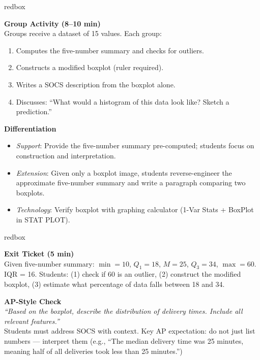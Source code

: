 \documentclass[10pt]{article}
\begin{document}
\boxguard
\begin{skillbox}{redbox}
\begin{minipage}[t]{0.48\linewidth}
    \textbf{Group Activity (8--10 min)}\\
    Groups receive a dataset of 15 values. Each group:
    \begin{enumerate}
        \item Computes the five-number summary and checks for outliers.
        \item Constructs a modified boxplot (ruler required).
        \item Writes a SOCS description from the boxplot alone.
        \item Discusses: ``What would a histogram of this data look like? Sketch a prediction.''
    \end{enumerate}
\end{minipage}
\hfill
\begin{minipage}[t]{0.48\linewidth}
    \textbf{Differentiation}
    \begin{itemize}
        \item \textit{Support}: Provide the five-number summary pre-computed; students focus on construction and interpretation.
        \item \textit{Extension}: Given only a boxplot image, students reverse-engineer the approximate five-number summary and write a paragraph comparing two boxplots.
        \item \textit{Technology}: Verify boxplot with graphing calculator (1-Var Stats + BoxPlot in STAT PLOT).
    \end{itemize}
\end{minipage}
\end{skillbox}

\boxguard
\begin{skillbox}{redbox}
\begin{minipage}[t]{0.48\linewidth}
    \textbf{Exit Ticket (5 min)}\\
    Given five-number summary: $\min=10$, $Q_1=18$, $M=25$, $Q_3=34$, $\max=60$. IQR = 16. Students: (1) check if 60 is an outlier, (2) construct the modified boxplot, (3) estimate what percentage of data falls between 18 and 34.
\end{minipage}
\hfill
\begin{minipage}[t]{0.48\linewidth}
    \textbf{AP-Style Check}\\
    \textit{``Based on the boxplot, describe the distribution of delivery times. Include all relevant features.''}\\[4pt]
    Students must address SOCS with context. Key AP expectation: do not just list numbers --- interpret them (e.g., ``The median delivery time was 25 minutes, meaning half of all deliveries took less than 25 minutes.'')
\end{minipage}
\end{skillbox}
\end{document}
